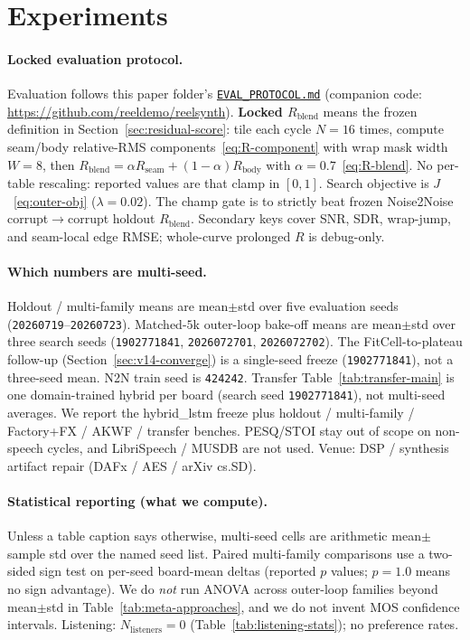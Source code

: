 \section{Experiments}
\label{sec:experiments}

\paragraph{Locked evaluation protocol.}
Evaluation follows this paper folder's
\href{https://github.com/reeldemo/denoise-opt-meta/blob/master/paper/Unsupervised_Wrap-Discontinuity_Repair_in_Wavetable_Synthesis_via_Hybrid_GA-PPO_Meta-Search_v14/EVAL_PROTOCOL.md}{\texttt{EVAL\_PROTOCOL.md}}
(companion code: \url{https://github.com/reeldemo/reelsynth}).
\textbf{Locked $R_{\mathrm{blend}}$} means the frozen definition in Section~\ref{sec:residual-score}:
tile each cycle $N{=}16$ times, compute seam/body relative-RMS components~\eqref{eq:R-component} with wrap mask width $W{=}8$, then
$R_{\mathrm{blend}}=\alpha R_{\mathrm{seam}}+(1-\alpha)R_{\mathrm{body}}$ with $\alpha{=}0.7$~\eqref{eq:R-blend}.
No per-table rescaling: reported values are that clamp in $[0,1]$.
Search objective is $J$~\eqref{eq:outer-obj} ($\lambda{=}0.02$).
The champ gate is to strictly beat frozen Noise2Noise corrupt$\to$corrupt holdout $R_{\mathrm{blend}}$.
Secondary keys cover SNR, SDR, wrap-jump, and seam-local edge RMSE; whole-curve prolonged $R$ is debug-only.
\paragraph{Which numbers are multi-seed.}
Holdout / multi-family means are mean$\pm$std over five evaluation seeds (\texttt{20260719}--\texttt{20260723}).
Matched-$5$k outer-loop bake-off means are mean$\pm$std over three search seeds (\texttt{1902771841}, \texttt{2026072701}, \texttt{2026072702}).
The FitCell-to-plateau follow-up (Section~\ref{sec:v14-converge}) is a single-seed freeze (\texttt{1902771841}), not a three-seed mean.
N2N train seed is \texttt{424242}.
Transfer Table~\ref{tab:transfer-main} is one domain-trained hybrid per board (search seed \texttt{1902771841}), not multi-seed averages.
We report the hybrid\_lstm freeze plus holdout / multi-family / Factory+FX / AKWF / transfer benches.
PESQ/STOI stay out of scope on non-speech cycles, and LibriSpeech / MUSDB are not used.
Venue: DSP / synthesis artifact repair (DAFx / AES / arXiv cs.SD).

\paragraph{Statistical reporting (what we compute).}
Unless a table caption says otherwise, multi-seed cells are arithmetic mean$\pm$sample std over the named seed list.
Paired multi-family comparisons use a two-sided sign test on per-seed board-mean deltas (reported $p$ values; $p{=}1.0$ means no sign advantage).
We do \emph{not} run ANOVA across outer-loop families beyond mean$\pm$std in Table~\ref{tab:meta-approaches}, and we do not invent MOS confidence intervals.
Listening: $N_{\mathrm{listeners}}{=}0$ (Table~\ref{tab:listening-stats}); no preference rates.

